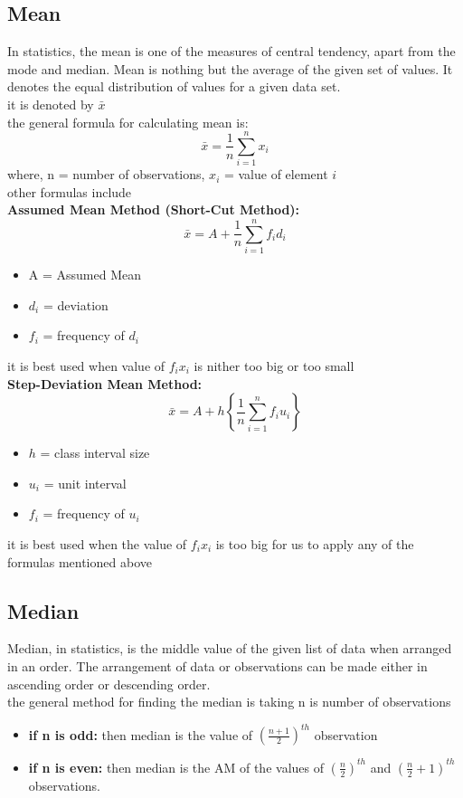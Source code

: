 \documentclass[12pt]{article}
\begin{document}
\subsection{Mean}
In statistics, the mean is one of the measures of central tendency, apart from the mode and median. Mean is nothing but the average of the given set of values. It denotes the equal distribution of values for a given data set.\\
it is denoted by $\bar{x}$\\
the general formula for calculating mean is:
$$ \bar{x} = \frac{1}{n}\sum_{i=1}^nx_i $$
where, n = number of observations, $x_i$ = value of element $i$\\
other formulas include\\
\textbf{Assumed Mean Method (Short-Cut Method):}
$$ \bar{x} = A + \frac{1}{n}\sum^n_{i=1}f_id_i $$
\begin{itemize}
    \item A = Assumed Mean
    \item $d_i$ = deviation
    \item $f_i$ = frequency of $d_i$
\end{itemize}
it is best used when value of $f_ix_i$ is nither too big or too small\\
\textbf{Step-Deviation Mean Method:}
$$ \bar{x} = A + h\left\{\frac{1}{n}\sum_{i=1}^nf_iu_i\right\} $$
\begin{itemize}
    \item $h$ = class interval size
    \item $u_i$ = unit interval
    \item $f_i$ = frequency of $u_i$
\end{itemize}
it is best used when the value of $f_ix_i$ is too big for us to apply any of the formulas mentioned above\\

\subsection{Median}
Median, in statistics, is the middle value of the given list of data when arranged in an order. The arrangement of data or observations can be made either in ascending order or descending order.\\
the general method for finding the median is
taking n is number of observations
\begin{itemize}
    \item \textbf{if n is odd: }
    then median is the value of $\left(\frac{n+1}{2}\right)^{th}$ observation
    \item \textbf{if n is even: }
    then median is the AM of the values of $\left(\frac{n}{2}\right)^{th}$ and $\left(\frac{n}{2} + 1\right)^{th}$ observations.
\end{itemize}
\end{document}
